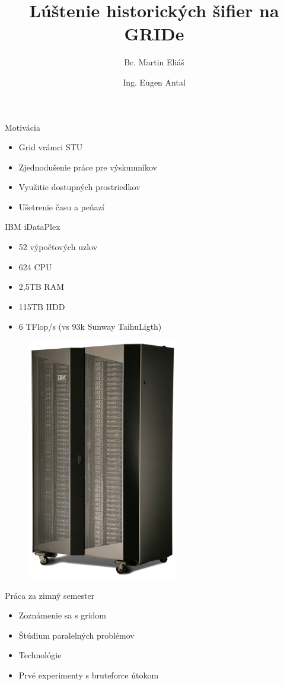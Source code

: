 \documentclass{beamer}
\title{Lúštenie historických šifier na GRIDe}
\author{Bc. Martin Eliáš}
\date{Ing. Eugen Antal}
\institute{Slovenská technická univerzita v Bratislave}
\begin{document}
\maketitle

\begin{frame}{Motivácia}
	\begin{itemize}
    \item Grid vrámci STU
		\item Zjednodušenie práce pre výskumníkov
		\item Využitie dostupných prostriedkov
    \item Ušetrenie času a peňazí
  	\end{itemize}
\end{frame}

\begin{frame}{IBM iDataPlex}
  \begin{itemize}
      \item 52 výpočtových uzlov
      \item 624 CPU
      \item 2,5TB RAM
      \item 115TB HDD
      \item 6 TFlop/s (vs 93k Sunway TaihuLigth)
    \end{itemize}

  \begin{figure}
    \includegraphics[scale=0.8]{img/hpc.png}
  \end{figure}
\end{frame}

\begin{frame}{Práca za zimný semester}
	\begin{itemize}
      \item Zoznámenie sa s gridom
		  \item Štúdium paralelných problémov
      \item Technológie
  		\item Prvé experimenty s bruteforce útokom
  	\end{itemize}
\end{frame}
\end{document}
